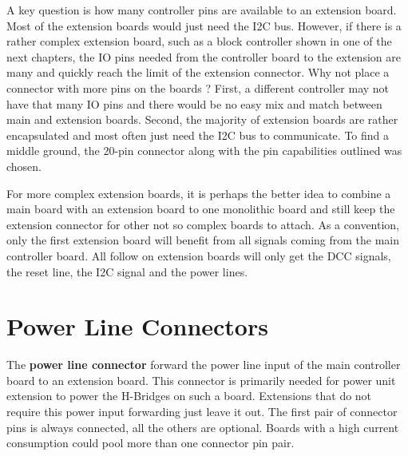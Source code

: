 A key question is how many controller pins are available to an extension board. Most of the extension boards would just need the I2C bus. However, if there is a rather complex extension board, such as a block controller shown in one of the next chapters, the IO pins needed from the controller board to the extension are many and quickly reach the limit of the extension connector. Why not place a connector with more pins on the boards ? First, a different controller may not have that many IO pins and there would be no easy mix and match between main and extension boards. Second, the majority of extension boards are rather encapsulated and most often just need the I2C bus to communicate. To find a middle ground, the 20-pin connector along with the pin capabilities outlined was chosen. 

For more complex extension boards, it is perhaps the better idea to combine a main board with an extension board to one monolithic board and still keep the extension connector for other not so complex boards to attach. As a convention, only the first extension board will benefit from all signals coming from the main controller board. All follow on extension boards will only get the DCC signals, the reset line, the I2C signal and the power lines.

\section{Power Line Connectors}

The \textbf{power line connector} forward the power line input of the main controller board to an extension board. This connector is primarily needed for power unit extension to power the H-Bridges on such a board. Extensions that do not require this power input forwarding just leave it out. The first pair of connector pins is always connected, all the others are optional. Boards with a high current consumption could pool more than one connector pin pair.

